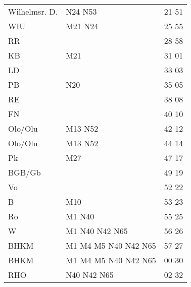 \begin{tabular}{!{\color{schiefergrau}\vrule width 3pt}*{3}{l!{\color{schiefergrau}\vrule width 3pt}}}
\hline
{}
 \\
\hline
Wilhelmsr. D.& \nbus{} N24 N53                                            & 21 51 \\
WIU          & \mbus{} M21 \nbus{} N24                                    & 25 55 \\
RR           &                                                            & 28 58 \\
KB           & \mbus{} M21                                                & 31 01 \\
LD           &                                                            & 33 03 \\
PB           & \nbus{} N20                                                & 35 05 \\
RE           &                                                            & 38 08 \\
FN           &                                                            & 40 10 \\
Olo/Olu      & \nuneun{} \mtram{} M13 \nbus{} N52                         & 42 12 \\
\hline
Olo/Olu      & \nuneun{} \mtram{} M13 \nbus{} N52                         & 44 14 \\
Pk           & \mbus{} M27                                                & 47 17 \\
BGB/Gb       &                                                            & 49 19 \\
Vo           &                                                            & 52 22 \\
B            & \mtram{} M10                                               & 53 23 \\
Ro           & \mtram{} M1 \nbus{} N40                                    & 55 25 \\
W            & \nuzwei{} \nufuenf{} \mtram{} M1 \nbus{} N40 N42 N65       & 56 26 \\
BHKM         & \nuzwei{} \nufuenf{} \mtram{} M1 M4 M5 \nbus{} N40 N42 N65 & 57 27 \\
\hline
BHKM         & \nuzwei{} \nufuenf{} \mtram{} M1 M4 M5 \nbus{} N40 N42 N65 & 00 30 \\
RHO          & \nuzwei{} \nbus{} N40 N42 N65                              & 02 32 \\

\end{tabular}
